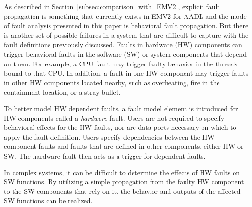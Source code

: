 As described in Section~\ref{subsec:comparison_with_EMV2}, explicit fault propagation is something that currently exists in EMV2 for AADL and the mode of fault analysis presented in this paper is behavioral fault propagation. But there is another set of possible failures in a system that are difficult to capture with the fault definitions previously discussed. Faults in hardware (HW) components can trigger behavioral faults in the software (SW) or system components that depend on them. For example, a CPU fault may trigger faulty behavior in the threads bound to that CPU. In addition, a fault in one HW component may trigger faults in other HW components located nearby, such as overheating, fire in the containment location, or a stray bullet. 

To better model HW dependent faults, a fault model element is introduced for HW components called a \textit{hardware} fault. Users are not required to specify behavioral effects for the HW faults, nor are data ports necessary on which to apply the fault definition. Users specify dependencies between the HW component faults and faults that are defined in other components, either HW or SW. The hardware fault then acts as a trigger for dependent faults. 

In complex systems, it can be difficult to determine the effects of HW faults on SW functions. By utilizing a simple propagation from the faulty HW component to the SW components that rely on it, the behavior and outputs of the affected SW functions can be realized. 

